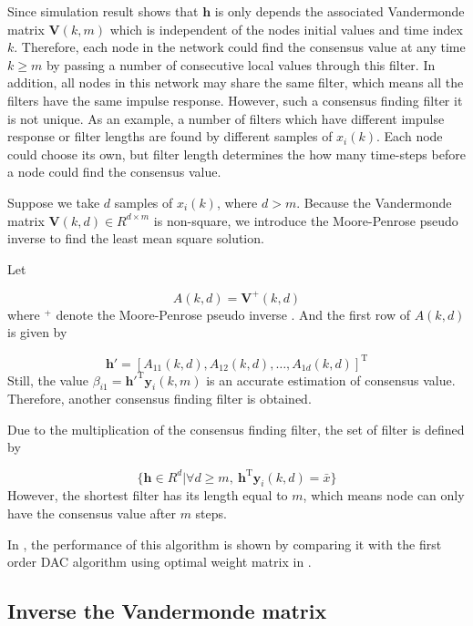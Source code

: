 Since simulation result shows that $\mathbf{h}$ is only depends the
associated Vandermonde matrix $\mathbf{V}(k,m)$ which is independent
of the nodes initial values and time index $k$. Therefore, each node
in the network could find the consensus value at any time $k\geqslant m$
by passing a number of consecutive local values through this filter.
In addition, all nodes in this network may share the same filter,
which means all the filters have the same impulse response. However,
such a consensus finding filter it is not unique. As an example, a
number of filters which have different impulse response or filter
lengths are found by different samples of $x_{i}(k)$.  Each node
could choose its own, but filter length determines the how many time-steps
before a node could find the consensus value. 

Suppose we take $d$ samples of $x_{i}(k)$, where $d>m$. Because
the Vandermonde matrix $\mathbf{V}(k,d)\in R^{d\times m}$ is non-square,
we introduce the Moore-Penrose pseudo inverse to find the least mean
square solution. 

Let

\begin{equation}
A(k,d)=\mathbf{V}^{+}(k,d)
\end{equation}
where $^{+}$ denote the Moore-Penrose pseudo inverse \cite{Piziak2007}.
And the first row of $A(k,d)$ is given by 

\begin{equation}
\mathbf{h}'=\left[A{}_{11}(k,d),A_{12}(k,d),\ldots,A_{1d}(k,d)\right]^{\mathrm{T}}
\end{equation}
Still, the value $\beta_{i1}=\mathbf{h}'^{\mathrm{T}}\mathbf{y}_{i}(k,m)$
is an accurate estimation of consensus value. Therefore, another consensus
finding filter is obtained.

Due to the multiplication of the consensus finding filter, the set
of filter is defined by

\begin{equation}
\{\mathbf{h}\in R^{d}|\forall d\geqslant m,\:\mathbf{h}^{\mathrm{T}}\mathbf{y}_{i}(k,d)=\bar{x}\}
\end{equation}
However, the shortest filter has its length equal to $m$, which means
node can only have the consensus value after $m$ steps. 

In , the performance of this
algorithm is shown by comparing it with the first order DAC algorithm
using optimal weight matrix in \cite{Xiao2004}.


\subsection{Inverse the Vandermonde matrix}

